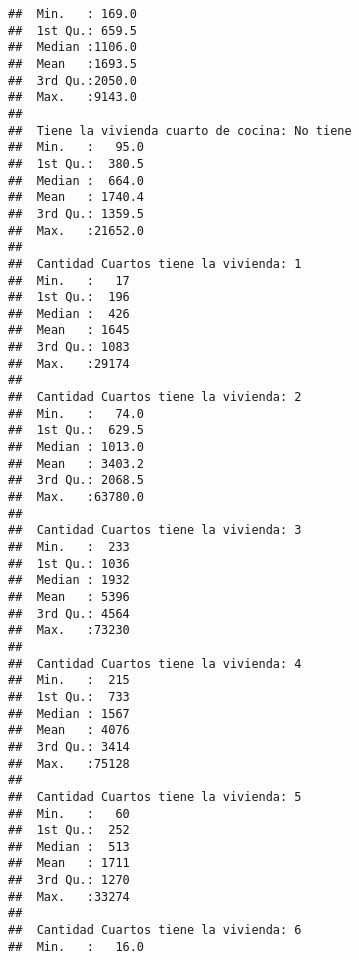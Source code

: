 \documentclass[11pt,]{article}
\begin{document}
\begin{verbatim}
##  Min.   : 169.0                                              
##  1st Qu.: 659.5                                              
##  Median :1106.0                                              
##  Mean   :1693.5                                              
##  3rd Qu.:2050.0                                              
##  Max.   :9143.0                                              
##                                                              
##  Tiene la vivienda cuarto de cocina: No tiene
##  Min.   :   95.0                             
##  1st Qu.:  380.5                             
##  Median :  664.0                             
##  Mean   : 1740.4                             
##  3rd Qu.: 1359.5                             
##  Max.   :21652.0                             
##                                              
##  Cantidad Cuartos tiene la vivienda: 1
##  Min.   :   17                        
##  1st Qu.:  196                        
##  Median :  426                        
##  Mean   : 1645                        
##  3rd Qu.: 1083                        
##  Max.   :29174                        
##                                       
##  Cantidad Cuartos tiene la vivienda: 2
##  Min.   :   74.0                      
##  1st Qu.:  629.5                      
##  Median : 1013.0                      
##  Mean   : 3403.2                      
##  3rd Qu.: 2068.5                      
##  Max.   :63780.0                      
##                                       
##  Cantidad Cuartos tiene la vivienda: 3
##  Min.   :  233                        
##  1st Qu.: 1036                        
##  Median : 1932                        
##  Mean   : 5396                        
##  3rd Qu.: 4564                        
##  Max.   :73230                        
##                                       
##  Cantidad Cuartos tiene la vivienda: 4
##  Min.   :  215                        
##  1st Qu.:  733                        
##  Median : 1567                        
##  Mean   : 4076                        
##  3rd Qu.: 3414                        
##  Max.   :75128                        
##                                       
##  Cantidad Cuartos tiene la vivienda: 5
##  Min.   :   60                        
##  1st Qu.:  252                        
##  Median :  513                        
##  Mean   : 1711                        
##  3rd Qu.: 1270                        
##  Max.   :33274                        
##                                       
##  Cantidad Cuartos tiene la vivienda: 6
##  Min.   :   16.0                      

\end{verbatim}
\end{document}
